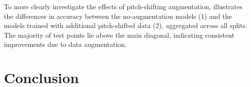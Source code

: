 \documentclass{article}
\begin{document}
To more clearly investigate the effects of pitch-shifting augmentation, 
illustrates the differences in accuracy between the no-augmentation models (1) and the
models trained with additional pitch-shifted data (2), aggregated across all splits.  
The majority of test points lie above the main diagonal, indicating
consistent improvements due to data augmentation.

\section{Conclusion}


\end{document}
